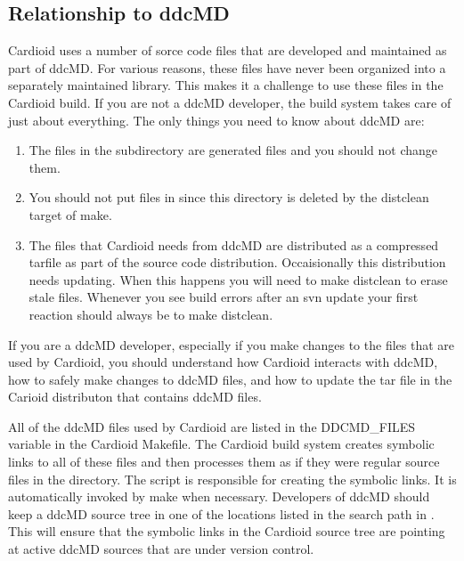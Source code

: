 \documentclass{article}
\begin{document}
\subsection{Relationship to ddcMD}
\label{ssec:ddcMD}

Cardioid uses a number of sorce code files that are developed and
maintained as part of ddcMD.  For various reasons, these files have
never been organized into a separately maintained library.  This makes
it a challenge to use these files in the Cardioid build.  If you are not
a ddcMD developer, the build system takes care of just about everything.
The only things you need to know about ddcMD are:
\begin{enumerate}
\item The files in the  subdirectory are generated
  files and you should not change them.  
\item You should not put files in  since this
  directory is deleted by the distclean target of make.
\item The files that Cardioid needs from ddcMD are distributed as a
  compressed tarfile as part of the source code distribution.
  Occaisionally this distribution needs updating.  When this happens you
  will need to make distclean to erase stale files.  Whenever you see
  build errors after an svn update your first reaction should always be
  to make distclean.
\end{enumerate}

If you are a ddcMD developer, especially if you make changes to the
files that are used by Cardioid, you should understand how Cardioid
interacts with ddcMD, how to safely make changes to ddcMD files, and how
to update the tar file in the Carioid distributon that contains ddcMD
files.

All of the ddcMD files used by Cardioid are listed in the DDCMD\_FILES
variable in the Cardioid Makefile.  The Cardioid build system creates
symbolic links to all of these files and then processes them as if they
were regular source files in the  directory.  The script
 is responsible for creating the symbolic links.
It is automatically invoked by make when necessary.  
Developers of ddcMD should keep a ddcMD source tree in one of the
locations listed in the search path in .  This
will ensure that the symbolic links in the Cardioid source tree are
pointing at active ddcMD sources that are under version control.
\end{document}
